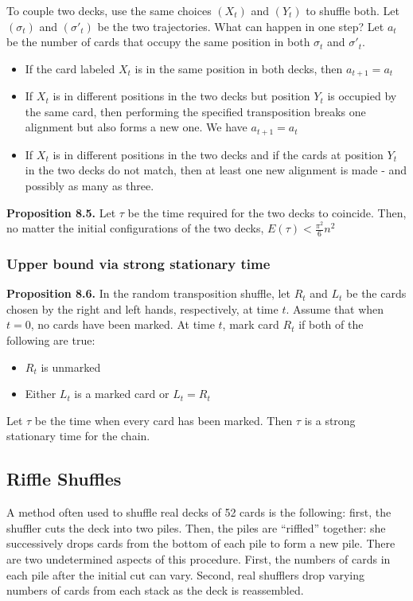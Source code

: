 \documentclass[12pt]{article}
\begin{document}
To couple two decks, use the same choices $(X_t)$ and $(Y_t)$ to shuffle both. Let $(\sigma_t)$ and $(\sigma'_t)$ be the two trajectories. What can happen in one step? Let $a_t$ be the number of cards that occupy the same position in both $\sigma_t$ and $\sigma'_t$.
\begin{itemize}
\item If the card labeled $X_t$ is in the same position in both decks, then $a_{t+1} = a_t$
\item If $X_t$ is in different positions in the two decks but position $Y_t$ is occupied by the same card, then performing the specified transposition breaks one alignment but also forms a new one. We have $a_{t+1} = a_t$
\item If $X_t$ is in different positions in the two decks and if the cards at position $Y_t$ in the two decks do not match, then at least one new alignment is made - and possibly as many as three.
\end{itemize}

\textbf{Proposition 8.5.} Let $\tau$ be the time required for the two decks to coincide. Then, no matter the initial configurations of the two decks, $E(\tau) < \frac{\pi^2}{6} n^2$

\subsubsection{Upper bound via strong stationary time}

\textbf{Proposition 8.6.} In the random transposition shuffle, let $R_t$ and $L_t$ be the cards chosen by the right and left hands, respectively, at time $t$. Assume that when $t= 0$, no cards have been marked. At time $t$, mark card $R_t$ if both of the following are true:
\begin{itemize}
\item $R_t$ is unmarked
\item Either $L_t$ is a marked card or $L_t = R_t$
\end{itemize}
Let $\tau$ be the time when every card has been marked. Then $\tau$ is a strong stationary time for the chain.

\subsection{Riffle Shuffles}

A method often used to shuffle real decks of 52 cards is the following: first, the shuffler cuts the deck into two piles. Then, the piles are ``riffled'' together: she successively drops cards from the bottom of each pile to form a new pile. There are two undetermined aspects of this procedure. First, the numbers of cards in each pile after the initial cut can vary. Second, real shufflers drop varying numbers of cards from each stack as the deck is reassembled.\\
\end{document}
